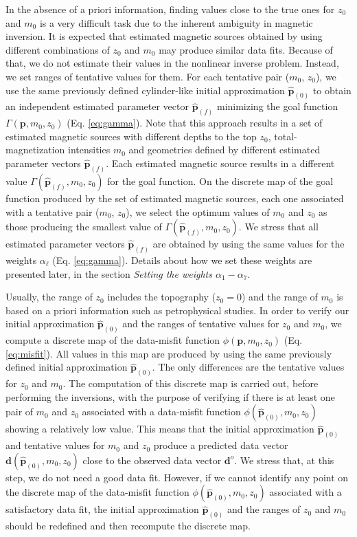 In the absence of a priori information, finding values close to the true ones
for $z_0$ and $m_0$ is a very difficult task due to the inherent ambiguity
in magnetic inversion. It is expected that estimated magnetic sources obtained by
using different combinations of $z_0$ and $m_0$ may produce similar data fits.
Because of that, we do not estimate their values in the nonlinear inverse problem.
Instead, we set ranges of tentative values for them.
For each tentative pair ($m_0$, $z_0$), we use the same previously defined 
cylinder-like initial approximation $\hat{\mathbf{p}}_{(0)}$ to 
obtain an independent estimated parameter vector $\hat{\mathbf{p}}_{(f)}$ 
minimizing the goal function $\Gamma (\mathbf{p}, m_{0}, z_{0})$ 
(Eq. \ref{eq:gamma}).
Note that this approach results in a set of estimated magnetic sources with
different depths to the top $z_0$, total-magnetization intensities $m_0$ and 
geometries defined by different estimated parameter vectors $\hat{\mathbf{p}}_{(f)}$.
Each estimated magnetic source results in a different value 
$\Gamma (\hat{\mathbf{p}}_{(f)}, m_{0}, z_{0})$ for the goal function.
On the discrete map of the goal function produced by the set of estimated magnetic
sources, each one associated with a tentative pair ($m_0$, $z_0$), 
we select the optimum values of $m_{0}$ and $z_{0}$ as those producing the smallest
value of $\Gamma (\hat{\mathbf{p}}_{(f)}, m_{0}, z_{0})$. 
We stress that all estimated parameter vectors $\hat{\mathbf{p}}_{(f)}$ are obtained
by using the same values for the weights $\alpha_{\ell}$ (Eq. \ref{eq:gamma}).
Details about how we set these weights are presented later, in the section
\textit{Setting the weights $\alpha_{1}-\alpha_{7}$}.

Usually, the range of $z_0$ includes the topography ($z_0 = 0$) and the range of 
$m_0$ is based on a priori information such as petrophysical studies.
In order to verify our initial approximation $\hat{\mathbf{p}}_{(0)}$ and the
ranges of tentative values for $z_0$ and $m_0$, we compute a discrete map
of the data-misfit function $\phi (\mathbf{p}, m_{0}, z_{0})$ (Eq. \ref{eq:misfit}).
All values in this map are produced by using the same previously defined 
initial approximation $\hat{\mathbf{p}}_{(0)}$. The only differences are the 
tentative values for $z_0$ and $m_0$. 
The computation of this discrete map is carried out, before performing the 
inversions, with the purpose of verifying if there is at least one pair of $ m_0 $ and $ z_0 $ 
associated with a data-misfit function $\phi (\hat{\mathbf{p}}_{(0)}, m_{0}, z_{0})$ 
showing a relatively low value. This means that the initial approximation $\hat{\mathbf{p}}_{(0)}$
and tentative values for $m_{0}$ and $z_{0}$ produce a predicted data vector 
$\mathbf{d}(\hat{\mathbf{p}}_{(0)}, m_{0}, z_{0})$ close to the observed 
data vector $\mathbf{d}^{o}$.
We stress that, at this step, we do not need a good data fit.
However, if we cannot identify any point on the discrete map of the data-misfit function 
$\phi (\hat{\mathbf{p}}_{(0)}, m_{0}, z_{0})$ associated with a satisfactory
data fit, the initial approximation $\hat{\mathbf{p}}_{(0)}$ 
and the ranges of $ z_0 $ and $ m_0 $ should be redefined and then recompute the discrete map.

